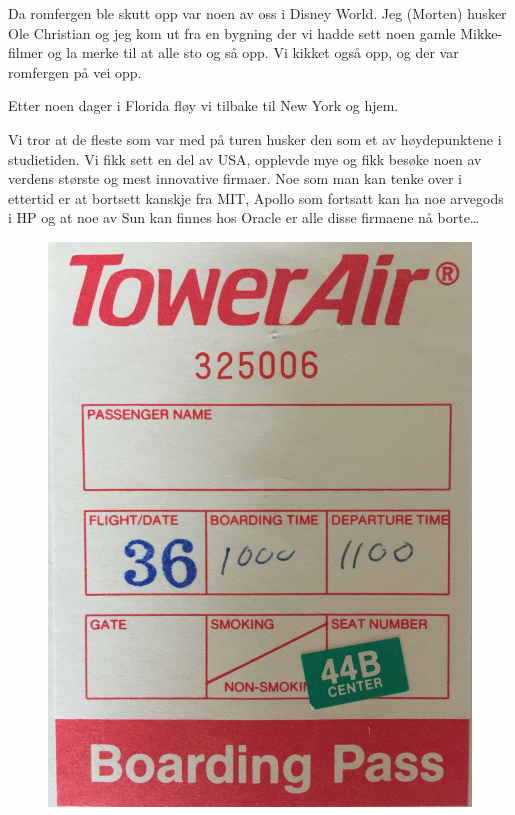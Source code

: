 \documentclass[../../main.tex]{subfiles}
\begin{document}
Da romfergen ble skutt opp var noen av oss i Disney World. Jeg (Morten) husker Ole Christian og jeg kom ut fra en bygning der vi hadde sett noen gamle Mikke-filmer og la merke til at alle sto og så opp. Vi kikket også opp, og der var romfergen på vei opp. 

Etter noen dager i Florida fløy vi tilbake til New York og hjem.

Vi tror at de fleste som var med på turen husker den som et av høydepunktene i studietiden. Vi fikk sett en del av USA, opplevde mye og fikk besøke noen av verdens største og mest innovative firmaer. Noe som man kan tenke over i ettertid er at bortsett kanskje fra MIT, Apollo som fortsatt kan ha noe arvegods i HP og at noe av Sun kan finnes hos Oracle er alle disse firmaene nå borte…

\begin{figure}
	\includegraphics[width=\linewidth]{images/usa88/IMG_3853.jpg}
\end{figure}
\end{document}
